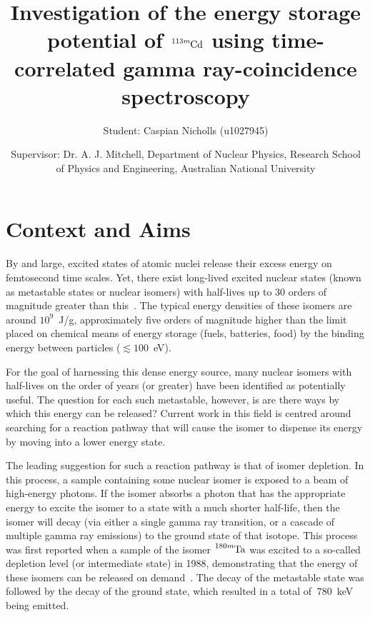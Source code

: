 \documentclass[12pt,a4paper]{article}
\begin{document}
\title{Investigation of the energy storage potential of $\ce{^{113m}Cd}$ using time-correlated gamma ray-coincidence spectroscopy}%
\author{Student: Caspian Nicholls (u1027945)}
\date{Supervisor: Dr. A. J. Mitchell, Department of Nuclear Physics, Research School of Physics and Engineering, Australian National University}

\maketitle
\section*{Context and Aims}

\medskip
By and large, excited states of atomic nuclei release their excess energy on femtosecond time scales. Yet, there exist long-lived excited nuclear states (known as metastable states or nuclear isomers) with half-lives up to 30 orders of magnitude greater than this~\cite{shaffer_innovations_2018}. The typical energy densities of these isomers are around $10^9$~J/g, approximately five orders of magnitude higher than the limit placed on chemical means of energy storage (fuels, batteries, food) by the binding energy between particles ($\lesssim 100$~eV).

\medskip
For the goal of harnessing this dense energy source, many nuclear isomers with half-lives on the order of years (or greater) have been identified as potentially useful. The question for each such metastable, however, is are there ways by which this energy can be released? Current work in this field is centred around searching for a reaction pathway that will cause the isomer to dispense its energy by moving into a lower energy state.

\medskip
The leading suggestion for such a reaction pathway is that of isomer depletion. In this process, a sample containing some nuclear isomer is exposed to a beam of high-energy photons. If the isomer absorbs a photon that has the appropriate energy to excite the isomer to a state with a much shorter half-life, then the isomer will decay (via either a single gamma ray transition, or a cascade of multiple gamma ray emissions) to the ground state of that isotope. This process was first reported when a sample of the isomer $\ce{^{180m}Ta}$ was excited to a so-called depletion level (or intermediate state) in 1988, demonstrating that the energy of these isomers can be released on demand~\cite{collins_depopulation_1988}. The decay of the metastable state was followed by the decay of the ground state, which resulted in a total of $~780$~keV being emitted. 
\end{document}
